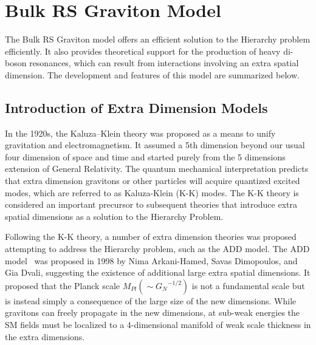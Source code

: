 \section{Bulk RS Graviton Model}
The Bulk RS Graviton model offers an efficient solution to the Hierarchy problem efficiently. It also provides theoretical support for the production of heavy di-boson resonances, which can result from interactions involving an extra spatial dimension. The development and features of this model are summarized below.
\subsection{Introduction of Extra Dimension Models}
In the 1920s, the Kaluza–Klein theory was proposed as a means to unify gravitation and electromagnetism. It assumed a 5th dimension beyond our usual four dimension of space and time and started purely from the 5 dimensions extension of General Relativity. The quantum mechamical interpretation predicts that extra dimension gravitons or other particles will acquire quantized excited modes, which are referred to as Kaluza-Klein (K-K) modes. The K-K theory is considered an important precursor to subsequent theories that introduce extra spatial dimensions as a solution to the Hierarchy Problem.

\vspace{0.3cm}
Following the K-K theory, a number of extra dimension theories was proposed attempting to address the Hierarchy problem, such as the ADD model. The ADD model~\cite{Intro_ADD,Intro_ADD2} was proposed in 1998 by Nima Arkani-Hamed, Savas Dimopoulos, and Gia Dvali, suggesting the existence of additional large extra spatial dimensions. It proposed that the Planck scale $M_{Pl}(\sim{G_{N}}^{-1/2})$ is not a fundamental scale but is instead simply a consequence of the large size of the new dimensions. While gravitons can freely propagate in the new dimensions, at sub-weak energies the SM fields must be localized to a 4-dimensional manifold of weak scale thickness in the extra dimensions. 

\vspace{0.3cm}

